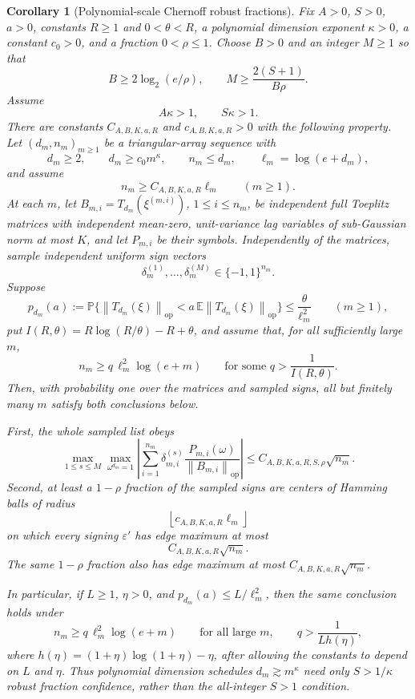 \documentclass[11pt]{amsart}
\numberwithin{equation}{section}
\newtheorem{corollary}[theorem]{Corollary}
\theoremstyle{definition}
\theoremstyle{remark}
\newcommand{\op}{\mathrm{op}}
\newcommand{\Prob}{\mathbb P}
\newcommand{\Exp}{\mathbb E}
\newcommand{\norm}[1]{\left\lVert #1\right\rVert}
\newcommand{\eps}{\varepsilon}
\begin{document}
\begin{corollary}[Polynomial-scale Chernoff robust fractions]
\label{cor:normalizer-tail-chernoff-borel-polynomial-fractions}
Fix \(A>0\), \(S>0\), \(a>0\), constants \(R\ge1\) and \(0<\theta<R\), a
polynomial dimension exponent \(\kappa>0\), a constant \(c_0>0\), and a
fraction \(0<\rho\le1\).  Choose \(B>0\) and an integer \(M\ge1\) so that
\[
  B\ge 2\log_2(e/\rho),
  \qquad
  M\ge \frac{2(S+1)}{B\rho}.
\]
Assume
\[
  A\kappa>1,\qquad S\kappa>1.
\]
There are constants \(C_{A,B,K,a,R}\) and \(c_{A,B,K,a,R}>0\) with the following
property.  Let \((d_m,n_m)_{m\ge1}\) be a triangular-array sequence with
\[
  d_m\ge2,\qquad d_m\ge c_0m^\kappa,\qquad
  n_m\le d_m,\qquad \ell_m=\log(e+d_m),
\]
and assume
\[
  n_m\ge C_{A,B,K,a,R}\ell_m \qquad(m\ge1).
\]
At each \(m\), let \(B_{m,i}=T_{d_m}(\xi^{(m,i)})\), \(1\le i\le n_m\), be
independent full Toeplitz matrices with independent mean-zero, unit-variance
lag variables of sub-Gaussian norm at most \(K\), and let \(P_{m,i}\) be their
symbols.  Independently of the matrices, sample independent uniform sign
vectors
\[
  \delta_m^{(1)},\ldots,\delta_m^{(M)}\in\{-1,1\}^{n_m}.
\]
Suppose
\[
  p_{d_m}(a):=
  \Prob\{\norm{T_{d_m}(\xi)}_{\op}
      <a\,\Exp\norm{T_{d_m}(\xi)}_{\op}\}
  \le \frac{\theta}{\ell_m^2}
  \qquad(m\ge1),
\]
put \(I(R,\theta)=R\log(R/\theta)-R+\theta\), and assume that, for all
sufficiently large \(m\),
\[
  n_m\ge q\,\ell_m^2\log(e+m)
  \qquad\text{for some } q>\frac1{I(R,\theta)} .
\]
Then, with probability one over the matrices and sampled signs, all but
finitely many \(m\) satisfy both conclusions below.

First, the whole sampled list obeys
\[
  \max_{1\le s\le M}\max_{\omega^{d_m}=1}
  \left|\sum_{i=1}^{n_m}\delta_{m,i}^{(s)}
  \frac{P_{m,i}(\omega)}{\norm{B_{m,i}}_{\op}}\right|
  \le C_{A,B,K,a,R,S,\rho}\sqrt{n_m}.
\]
Second, at least a \(1-\rho\) fraction of the sampled signs are centers of
Hamming balls of radius
\[
  \left\lfloor c_{A,B,K,a,R}\ell_m\right\rfloor
\]
on which every signing \(\eps'\) has edge maximum at most
\[
  C_{A,B,K,a,R}\sqrt{n_m}.
\]
The same \(1-\rho\) fraction also has edge maximum at most
\(C_{A,B,K,a,R}\sqrt{n_m}\).

In particular, if \(L\ge1\), \(\eta>0\), and
\(p_{d_m}(a)\le L/\ell_m^2\), then the same conclusion holds under
\[
  n_m\ge q\,\ell_m^2\log(e+m)
  \qquad\text{for all large }m,
  \qquad
  q>\frac1{Lh(\eta)},
\]
where \(h(\eta)=(1+\eta)\log(1+\eta)-\eta\),
after allowing the constants to depend on \(L\) and \(\eta\).  Thus polynomial
dimension schedules \(d_m\gtrsim m^\kappa\) need only \(S>1/\kappa\) robust
fraction confidence, rather than the all-integer \(S>1\) condition.
\end{corollary}
\end{document}
